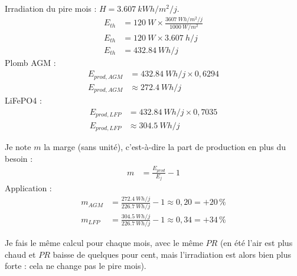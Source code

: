 \begin{demonstration}
Irradiation du pire mois : $H = \qty{3,607}{kWh/m^2/j}$.
\begin{align*}
E_{th} &= \qty{120}{W} \times \frac{\qty{3607}{Wh/m^2/j}}{\qty{1000}{W/m^2}}\\
E_{th} &= \qty{120}{W} \times \qty{3,607}{h/j}\\
E_{th} &= \qty{432,84}{Wh/j}
\end{align*}
Plomb AGM :
\begin{align*}
E_{prod,AGM} &= \qty{432,84}{Wh/j} \times 0{,}6294\\
E_{prod,AGM} &\approx \qty{272,4}{Wh/j}
\end{align*}
LiFePO4 :
\begin{align*}
E_{prod,LFP} &= \qty{432,84}{Wh/j} \times 0{,}7035\\
E_{prod,LFP} &\approx \qty{304,5}{Wh/j}
\end{align*}
\end{demonstration}

\begin{demonstration}
Je note $m$ la marge (sans unité), c'est-à-dire la part de production en plus du besoin :
\begin{align*}
m &= \frac{E_{prod}}{E_j} - 1
\end{align*}
Application :
\begin{align*}
m_{AGM} &= \frac{\qty{272,4}{Wh/j}}{\qty{226,7}{Wh/j}} - 1 \approx 0{,}20 = +20\,\%\\
m_{LFP} &= \frac{\qty{304,5}{Wh/j}}{\qty{226,7}{Wh/j}} - 1 \approx 0{,}34 = +34\,\%
\end{align*}
\end{demonstration}

Je fais le même calcul pour chaque mois, avec le même $PR$ (en été l'air est plus chaud et $PR$ baisse de quelques pour cent, mais l'irradiation est alors bien plus forte : cela ne change pas le pire mois).

